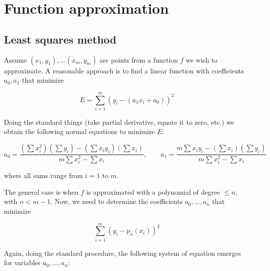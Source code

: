 \documentclass[12pt]{article}
\theoremstyle{definition}
\begin{document}
\section{Function approximation}

\subsection{Least squares method}

Assume $(x_1, y_1), \ldots (x_m, y_m)$ are points from a function $f$ we wish to
approximate. A reasonable approach is to find a linear function with
coefficients $a_0, a_1$ that minimize

\begin{equation*}
    E = \sum_{i=1}^m \left( y_i - (a_1 x_i + a_0) \right)^2
\end{equation*}

Doing the standard things (take partial derivative, equate it to zero, etc.) we
obtain the following normal equations to minimize $E$:

\begin{equation*}
    a_0 = \frac{\left( \sum x_i^2 \right)\left( \sum y_i \right) - \left( \sum
    x_i y_i \right) \left( \sum x_i \right)    }{m\sum x_i^2 - \sum x_i}, \qquad
    a_1 = \frac{m \sum x_i y_i - \left( \sum x_i \right)\left( \sum y_i \right)  }
    {m \sum x_i^2 - \sum x_i}
\end{equation*}

where all sums range from $i = 1$ to $m$. 

The general case is when $f$ is approximated with a polynomial of degree $\leq
n$, with $n < m - 1$. Now, we need to determine the coefficients $a_0, \ldots,
a_n$ that minimize 

\begin{equation*}
    \sum_{i=1}^m \left( y_i - p_n(x_i) \right)^2
\end{equation*}

Again, doing the standard procedure, the following system of equation emerges
for variables $a_0, \ldots, a_n$: 
\end{document}
